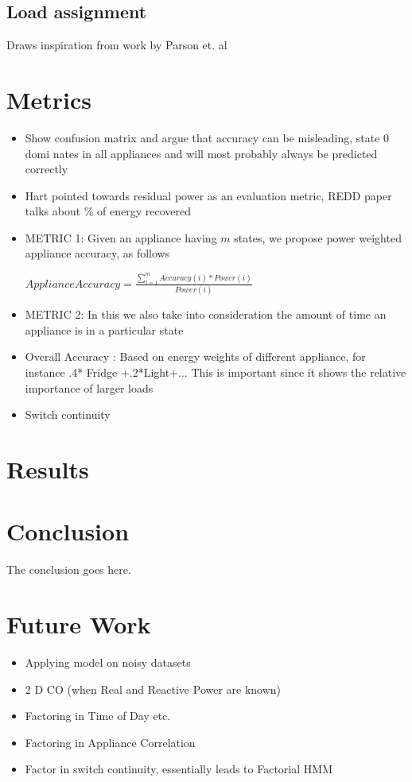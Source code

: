 \documentclass[conference]{IEEEtran}
\begin{document}
\subsection{Load assignment}
Draws inspiration from work by Parson et. al \cite{parson2012_aaai}


\section{Metrics}
\begin{itemize}
\item Show confusion matrix and argue that accuracy can be misleading, state 0 domi	nates in all appliances and will most probably always be predicted correctly
\item Hart pointed towards residual power as an evaluation metric, REDD paper talks about \% of energy recovered
\item METRIC 1: Given an appliance having $m$ states, we propose power weighted appliance accuracy, as follows

$Appliance Accuracy = \frac{\sum\limits_{i=1}^{m} Accuracy(i)*Power(i)}{Power(i)} $
\item METRIC 2: In this we also take into consideration the amount of time an appliance is in a particular state
\item Overall Accuracy : Based on energy weights of different appliance, for instance .4* Fridge +.2*Light+...
This is important since it shows the relative importance of larger loads 
\item Switch continuity
\end{itemize}
\section{Results}



\section{Conclusion}
The conclusion goes here.

\section{Future Work}
\begin{itemize}
\item Applying model on noisy datasets
\item 2 D CO (when Real and Reactive Power are known)
\item Factoring in Time of Day etc.
\item Factoring in Appliance Correlation
\item Factor in switch continuity, essentially leads to Factorial HMM
\end{itemize}
\end{document}
